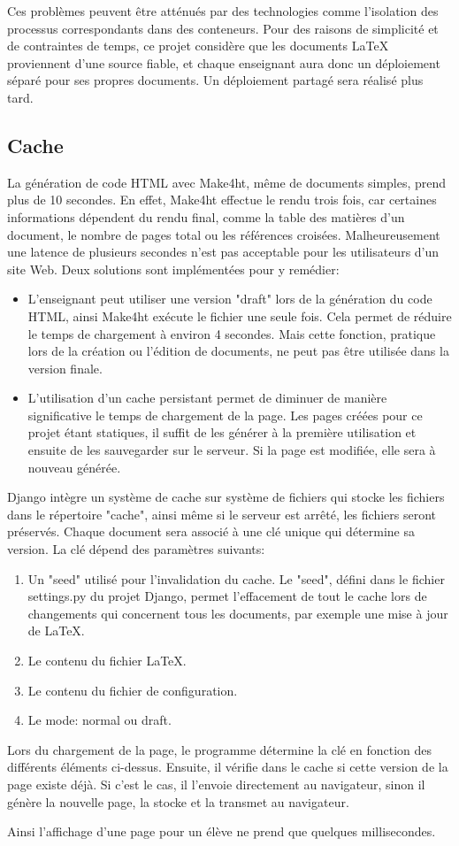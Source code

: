\documentclass[12pt,titlepage,oneside]{article}
\begin{document}
Ces problèmes peuvent être atténués par des technologies comme l'isolation des processus correspondants dans des conteneurs. Pour des raisons de simplicité et de contraintes de temps, ce projet considère que les documents LaTeX proviennent d'une source fiable, et chaque enseignant aura donc un déploiement séparé pour ses propres documents. Un déploiement partagé sera réalisé plus tard.

\subsection{Cache}
La génération de code HTML avec Make4ht, même de documents simples, prend plus de 10 secondes. En effet, Make4ht effectue le rendu trois fois, car certaines informations dépendent du rendu final, comme la table des matières d'un document, le nombre de pages total ou les références croisées. Malheureusement une latence de plusieurs secondes n'est pas acceptable pour les utilisateurs d'un site Web. Deux solutions sont implémentées pour y remédier:
\begin{itemize}
\item L'enseignant peut utiliser une version "draft" lors de la génération du code HTML, ainsi Make4ht exécute le fichier une seule fois. Cela permet de réduire le temps de chargement à environ 4 secondes. Mais cette fonction, pratique lors de la création ou l'édition de documents, ne peut pas être utilisée dans la version finale.
\item L'utilisation d'un cache persistant permet de diminuer de manière significative le temps de chargement de la page. Les pages créées pour ce projet étant statiques, il suffit de les générer à la première utilisation et ensuite de les sauvegarder sur le serveur. Si la page est modifiée, elle sera à nouveau générée.
\end{itemize}
Django intègre un système de cache sur système de fichiers qui stocke les fichiers dans le répertoire "cache", ainsi même si le serveur est arrêté, les fichiers seront préservés. Chaque document sera associé à une clé unique qui détermine sa version. La clé dépend des paramètres suivants:
\begin{enumerate}
\item Un "seed" utilisé pour l'invalidation du cache. Le "seed", défini dans le fichier settings.py du projet Django, permet l'effacement de tout le cache lors de changements qui concernent tous les documents, par exemple une mise à jour de LaTeX.
\item Le contenu du fichier LaTeX.
\item Le contenu du fichier de configuration.
\item Le mode: normal ou draft.
\end{enumerate}
Lors du chargement de la page, le programme détermine la clé en fonction des différents éléments ci-dessus. Ensuite, il vérifie dans le cache si cette version de la page existe déjà. Si c'est le cas, il l'envoie directement au navigateur, sinon il génère la nouvelle page, la stocke et la transmet au navigateur.\par
Ainsi l'affichage d'une page pour un élève ne prend que quelques millisecondes.
\end{document}
